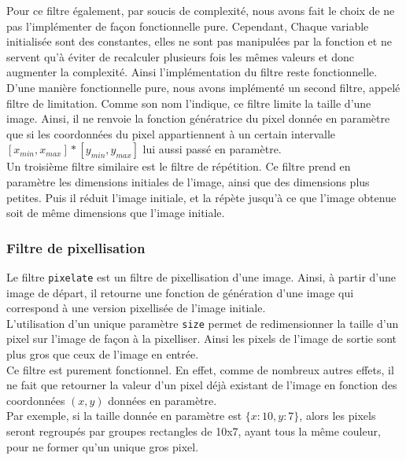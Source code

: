 \documentclass[11pt]{article}
\begin{document}
Pour ce filtre également, par soucis de complexité, nous avons fait le choix de ne pas l'implémenter de façon fonctionnelle pure. Cependant, Chaque variable initialisée sont des constantes, elles ne sont pas manipulées par la fonction et ne servent qu'à éviter de recalculer plusieurs fois les mêmes valeurs et donc augmenter la complexité. Ainsi l'implémentation du filtre reste fonctionnelle. \\

D'une manière fonctionnelle pure, nous avons implémenté un second filtre, appelé filtre de limitation. Comme son nom l'indique, ce filtre limite la taille d'une image. Ainsi, il ne renvoie la fonction génératrice du pixel donnée en paramètre que si les coordonnées du pixel appartiennent à un certain intervalle $[x_{min}, x_{max}] * [y_{min}, y_{max}]$ lui aussi passé en paramètre. \\

Un troisième filtre similaire est le filtre de répétition. Ce filtre prend en paramètre les dimensions initiales de l'image, ainsi que des dimensions plus petites. Puis il réduit l'image initiale, et la répète jusqu'à ce que l'image obtenue soit de même dimensions que l'image initiale.

\subsubsection{Filtre de pixellisation}

Le filtre \texttt{pixelate} est un filtre de pixellisation d'une image. Ainsi, à partir d'une image de départ, il retourne une fonction de génération d'une image qui correspond à une version pixellisée de l'image initiale. \\
L'utilisation d'un unique paramètre \texttt{size} permet de redimensionner la taille d'un pixel sur l'image de façon à la pixelliser. Ainsi les pixels de l'image de sortie sont plus gros que ceux de l'image en entrée. \\
 
Ce filtre est purement fonctionnel. En effet, comme de nombreux autres effets, il ne fait que retourner la valeur d'un pixel déjà existant de l'image en fonction des coordonnées $(x,y)$ données en paramètre. \\
 
Par exemple, si la taille donnée en paramètre est $\{x:10, y:7\}$, alors les pixels seront regroupés par groupes rectangles de 10x7, ayant tous la même couleur, pour ne former qu'un unique gros pixel.
 
\end{document}
